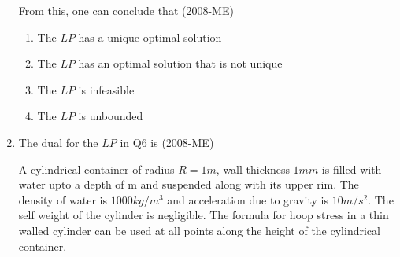 \documentclass[journal]{IEEEtran}
\begin{document}
\begin{enumerate}
\begin{table}[H]
    \centering
 
\end{table}
From this, one can conclude that \hfill(2008-ME)
\begin{enumerate}
    \item The $LP$ has a unique optimal solution 
    \item The $LP$ has an optimal solution that is not unique 
    \item The $LP$ is infeasible 
    \item The $LP$ is unbounded
\end{enumerate}
\item The dual for the $LP$ in Q6 is \hfill(2008-ME)
\begin{enumerate}
\end{enumerate}
 A cylindrical container of radius $R = 1m$, wall thickness 
$1 mm$ is filled with water upto a depth of 
m and suspended along with its upper rim. The density of water is $1000kg/m^3$ and acceleration due to gravity is $10m/s^2$. The self weight of the cylinder is negligible. The formula for hoop stress in a thin walled cylinder can be used at all points along the height of the cylindrical container. \\

\end{enumerate}
\end{document}
